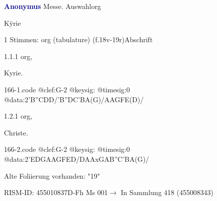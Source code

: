\documentclass[twocolumn]{book}
\begin{document}
\par \vspace{7pt} \textcolor{darkblue}{\textbf{Anonymus  }}\hfillplus{\textbf{[166]}}\newline Messe. Auswahl\newline org
\par \begin{itshape}[f.18v, at left:] Kÿrie\end{itshape} 
\par \textcolor{darkblue}{}  1 Stimmen: org (tabulature)  (f.18v-19r)\newline Abschrift
\par 1.1.1  org, \begin{itshape}Kyrie.\end{itshape}  
\begin{filecontents*}{166-1.code}
@clef:G-2
@keysig:
@timesig:0
@data:2'B''CDD/'B''DC'BA(G)/AAGFE(D)/
\end{filecontents*}
\newline
%
\par 1.2.1  org, \begin{itshape}Christe.\end{itshape}  
\begin{filecontents*}{166-2.code}
@clef:G-2
@keysig:
@timesig:0
@data:2'EDGAAGFED/DAAxGAB''C'BA(G)/
\end{filecontents*}
\newline
%
\par Alte Foliierung vorhanden: "19"
\par RISM-ID: 455010837\newline D-Fh  Ms 001\newline $\rightarrow$ In Sammlung 418 (455008343)
      
\end{document}

